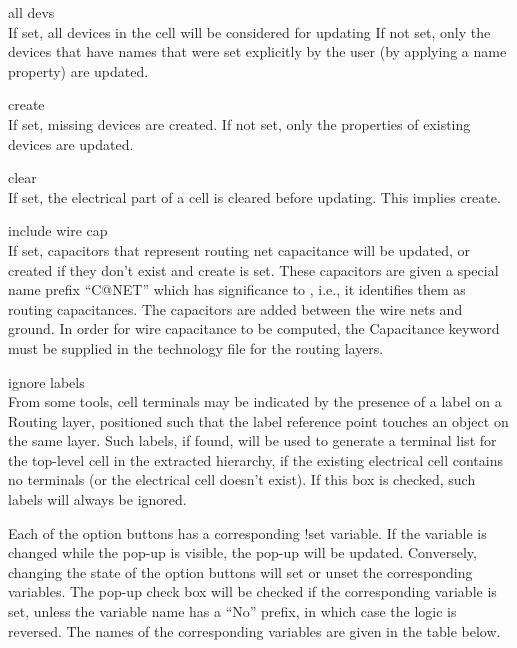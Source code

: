 \begin{description}
\item{\cb all devs}\\
If set, all devices in the cell will be considered for updating If not
set, only the devices that have names that were set explicitly by the
user (by applying a name property) are updated.

\item{\cb create}\\
If set, missing devices are created.  If not set, only the properties
of existing devices are updated.

\item{\cb clear}\\
If set, the electrical part of a cell is cleared before updating. 
This implies {\cb create}.

\item{\cb include wire cap}\\
If set, capacitors that represent routing net capacitance will be
updated, or created if they don't exist and {\cb create} is set. 
These capacitors are given a special name prefix ``{\vt C@NET}'' which
has significance to {\Xic}, i.e., it identifies them as routing
capacitances.  The capacitors are added between the wire nets and
ground.  In order for wire capacitance to be computed, the {\et
Capacitance} keyword must be supplied in the technology file for the
routing layers.

\item{\cb ignore labels}\\
From some tools, cell terminals may be indicated by the presence of a
label on a {\et Routing} layer, positioned such that the label
reference point touches an object on the same layer.  Such labels, if
found, will be used to generate a terminal list for the top-level cell
in the extracted hierarchy, if the existing electrical cell contains
no terminals (or the electrical cell doesn't exist).  If this box is
checked, such labels will always be ignored.
\end{description}

Each of the option buttons has a corresponding {\cb !set} variable. 
If the variable is changed while the pop-up is visible, the pop-up
will be updated.  Conversely, changing the state of the option buttons
will set or unset the corresponding variables.  The pop-up check box
will be checked if the corresponding variable is set, unless the
variable name has a ``No'' prefix, in which case the logic is
reversed.  The names of the corresponding variables are given in the
table below.

